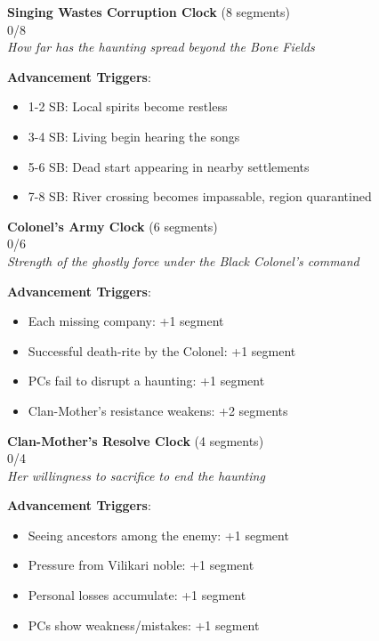 \documentclass[11pt]{article}
\newcommand{\clocksegment}{\textbullet}
\begin{document}
\begin{center}
\textbf{Singing Wastes Corruption Clock} (8 segments)\\
\fbox{\clocksegment\clocksegment\clocksegment\clocksegment\clocksegment\clocksegment\clocksegment\clocksegment} 0/8\\
\textit{How far has the haunting spread beyond the Bone Fields}
\end{center}

\textbf{Advancement Triggers}:
\begin{itemize}[leftmargin=*]
\item 1-2 SB: Local spirits become restless
\item 3-4 SB: Living begin hearing the songs
\item 5-6 SB: Dead start appearing in nearby settlements
\item 7-8 SB: River crossing becomes impassable, region quarantined
\end{itemize}

\begin{center}
\textbf{Colonel's Army Clock} (6 segments)\\
\fbox{\clocksegment\clocksegment\clocksegment\clocksegment\clocksegment\clocksegment} 0/6\\
\textit{Strength of the ghostly force under the Black Colonel's command}
\end{center}

\textbf{Advancement Triggers}:
\begin{itemize}[leftmargin=*]
\item Each missing company: +1 segment
\item Successful death-rite by the Colonel: +1 segment
\item PCs fail to disrupt a haunting: +1 segment
\item Clan-Mother's resistance weakens: +2 segments
\end{itemize}

\begin{center}
\textbf{Clan-Mother's Resolve Clock} (4 segments)\\
\fbox{\clocksegment\clocksegment\clocksegment\clocksegment} 0/4\\
\textit{Her willingness to sacrifice to end the haunting}
\end{center}

\textbf{Advancement Triggers}:
\begin{itemize}[leftmargin=*]
\item Seeing ancestors among the enemy: +1 segment
\item Pressure from Vilikari noble: +1 segment
\item Personal losses accumulate: +1 segment
\item PCs show weakness/mistakes: +1 segment
\end{itemize}
\end{document}
